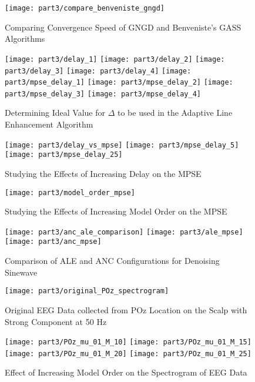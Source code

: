 \begin{figure}[H]
\centering{}
\texttt{[image: part3/compare\_benveniste\_gngd]}
\caption{Comparing Convergence Speed of GNGD and Benveniste's GASS Algorithms}
\end{figure}


\begin{figure}[H]
\centering{}
\texttt{[image: part3/delay\_1]}
\texttt{[image: part3/delay\_2]}
\texttt{[image: part3/delay\_3]}
\texttt{[image: part3/delay\_4]}
\texttt{[image: part3/mpse\_delay\_1]}
\texttt{[image: part3/mpse\_delay\_2]}
\texttt{[image: part3/mpse\_delay\_3]}
\texttt{[image: part3/mpse\_delay\_4]}
\caption{Determining Ideal Value for $\Delta$ to be used in the Adaptive Line Enhancement Algorithm}
\end{figure}

\begin{figure}[H]
\centering{}
\texttt{[image: part3/delay\_vs\_mpse]}
\texttt{[image: part3/mpse\_delay\_5]}
\texttt{[image: part3/mpse\_delay\_25]}
\caption{Studying the Effects of Increasing Delay on the MPSE}
\end{figure}

\begin{figure}[H]
\centering{}
\texttt{[image: part3/model\_order\_mpse]}
\caption{Studying the Effects of Increasing Model Order on the MPSE}
\end{figure}

\begin{figure}[H]
\centering{}
\texttt{[image: part3/anc\_ale\_comparison]}
\texttt{[image: part3/ale\_mpse]}
\texttt{[image: part3/anc\_mpse]}
\caption{Comparison of ALE and ANC Configurations for Denoising Sinewave}
\end{figure}

\begin{figure}[H]
\centering{}
\texttt{[image: part3/original\_POz\_spectrogram]}
\caption{Original EEG Data collected from POz Location on the Scalp with Strong Component at 50 Hz}
\end{figure}


\begin{figure}[H]
\centering{}
\texttt{[image: part3/POz\_mu\_01\_M\_10]}
\texttt{[image: part3/POz\_mu\_01\_M\_15]}
\texttt{[image: part3/POz\_mu\_01\_M\_20]}
\texttt{[image: part3/POz\_mu\_01\_M\_25]}
\caption{Effect of Increasing Model Order on the Spectrogram of EEG Data}
\end{figure}

